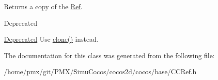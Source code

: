Returns a copy of the \hyperlink{classRef}{Ref}. \begin{DoxyRefDesc}{Deprecated}
\item[\hyperlink{deprecated__deprecated000288}{Deprecated}]Use \hyperlink{classClonable_a36b05a0fa605f4f269e5884bde7f9e0c}{clone()} instead. \end{DoxyRefDesc}


The documentation for this class was generated from the following file\+:\begin{DoxyCompactItemize}
\item 
/home/pmx/git/\+P\+M\+X/\+Simu\+Cocos/cocos2d/cocos/base/C\+C\+Ref.\+h\end{DoxyCompactItemize}
